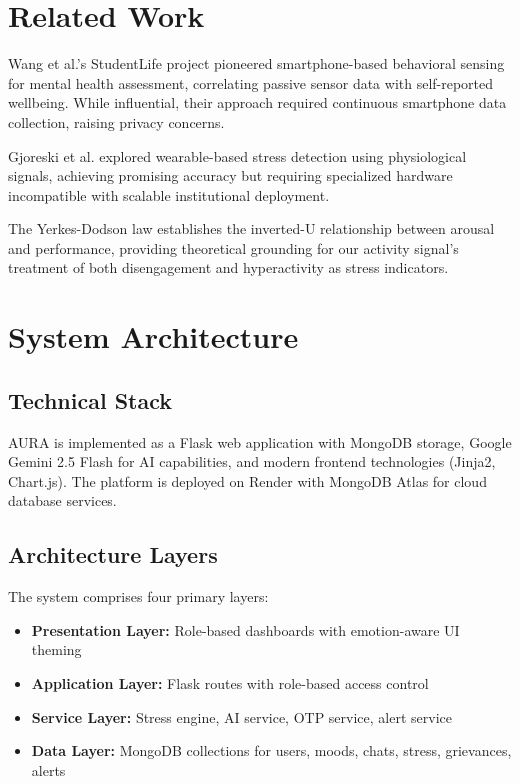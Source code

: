\documentclass[conference]{IEEEtran}
\begin{document}
\section{Related Work}

Wang et al.'s StudentLife project \cite{wang2014} pioneered smartphone-based behavioral sensing for mental health assessment, correlating passive sensor data with self-reported wellbeing. While influential, their approach required continuous smartphone data collection, raising privacy concerns.

Gjoreski et al. \cite{gjoreski2017} explored wearable-based stress detection using physiological signals, achieving promising accuracy but requiring specialized hardware incompatible with scalable institutional deployment.

The Yerkes-Dodson law \cite{yerkes1908} establishes the inverted-U relationship between arousal and performance, providing theoretical grounding for our activity signal's treatment of both disengagement and hyperactivity as stress indicators.

\section{System Architecture}

\subsection{Technical Stack}

AURA is implemented as a Flask web application with MongoDB storage, Google Gemini 2.5 Flash for AI capabilities, and modern frontend technologies (Jinja2, Chart.js). The platform is deployed on Render with MongoDB Atlas for cloud database services.

\subsection{Architecture Layers}

The system comprises four primary layers:
\begin{itemize}
    \item \textbf{Presentation Layer:} Role-based dashboards with emotion-aware UI theming
    \item \textbf{Application Layer:} Flask routes with role-based access control
    \item \textbf{Service Layer:} Stress engine, AI service, OTP service, alert service
    \item \textbf{Data Layer:} MongoDB collections for users, moods, chats, stress, grievances, alerts
\end{itemize}
\end{document}
